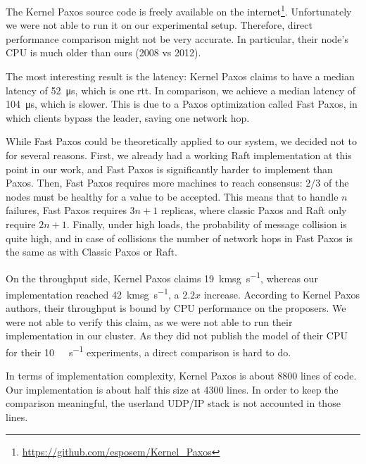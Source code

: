 The Kernel Paxos source code is freely available on the internet\footnote{\url{https://github.com/esposem/Kernel_Paxos}}.
Unfortunately we were not able to run it on our experimental setup.
Therefore, direct performance comparison might not be very accurate.
In particular, their node's CPU is much older than ours (2008 vs 2012).

The most interesting result is the latency: Kernel Paxos claims to have a median latency of \SI{52}{\micro\second}, which is one \gls{rtt}.
In comparison, we achieve a median latency of \SI{104}{\micro\second}, which is slower.  %
This is due to a Paxos optimization called Fast Paxos\cite{lamport2006fast}, in which clients bypass the leader, saving one network hop.

While Fast Paxos could be theoretically applied to our system, we decided not to for several reasons.
First, we already had a working Raft implementation at this point in our work, and Fast Paxos is significantly harder to implement than Paxos.
Then, Fast Paxos requires more machines to reach consensus: $2/3$ of the nodes must be healthy for a value to be accepted.
This means that to handle $n$ failures, Fast Paxos requires $3n + 1$ replicas, where classic Paxos and Raft only require $2n + 1$.
Finally, under high loads, the probability of message collision is quite high, and in case of collisions the number of network hops in Fast Paxos is the same as with Classic Paxos or Raft.

On the throughput side, Kernel Paxos claims \SI{19}{\kilo msg\per\second}, whereas our implementation reached \SI{42}{\kilo msg\per\second}, a $2.2x$ increase. %
According to Kernel Paxos authors, their throughput is bound by CPU performance on the proposers.
We were not able to verify this claim, as we were not able to run their implementation in our cluster.
As they did not publish the model of their CPU for their \SI{10}{\giga\bit\per\second} experiments, a direct comparison is hard to do.

In terms of implementation complexity, Kernel Paxos is about 8800 lines of code.
Our implementation is about half this size at 4300 lines.
In order to keep the comparison meaningful, the userland UDP/IP stack is not accounted in those lines.
